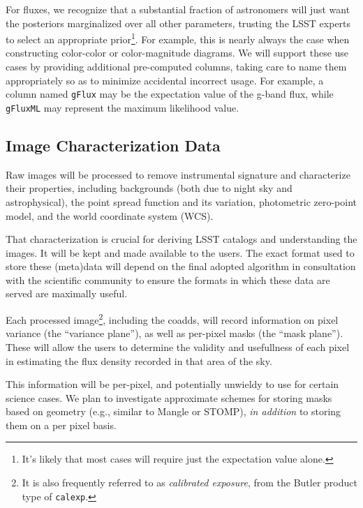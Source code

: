 \documentclass[SE,lsstdraft,toc]{lsstdoc}
\begin{document}
For fluxes, we recognize that a substantial fraction of astronomers will just want the posteriors marginalized over all other parameters, trusting the LSST experts to select an appropriate prior\footnote{It's likely that most cases will require just the expectation value alone.}. For example, this is nearly always the case when constructing color-color or color-magnitude diagrams. We will support these use cases by providing additional pre-computed columns, taking care to name them appropriately so as to minimize accidental incorrect usage. For example, a column named \texttt{gFlux} may be the expectation value of the g-band flux, while \texttt{gFluxML} may represent the maximum likelihood value.

\subsection{Image Characterization Data}

Raw images will be processed to remove instrumental signature and characterize their properties, including backgrounds (both due to night sky and astrophysical), the point spread function and its variation, photometric zero-point model, and the world coordinate system (WCS).

That characterization is crucial for deriving LSST catalogs and understanding the images. It will be kept and made available to the users. The exact format used to store these (meta)data will depend on the final adopted algorithm in consultation with the scientific community to ensure the formats in which these data are served are maximally useful.

Each processed image\footnote{It is also frequently referred to as \emph{calibrated exposure}, from the Butler product type of \texttt{calexp}.}, including the coadds, will record information on pixel variance (the ``variance plane''), as well as per-pixel masks (the ``mask plane''). These will allow the users to determine the validity and  usefullness  of each pixel in estimating the flux density recorded in that area of the sky.

This information will be per-pixel, and potentially unwieldy to use for certain science cases. We plan to investigate approximate schemes for storing masks based on geometry (e.g., similar to Mangle or STOMP), \emph{in addition} to storing them on a per pixel basis.
\end{document}
